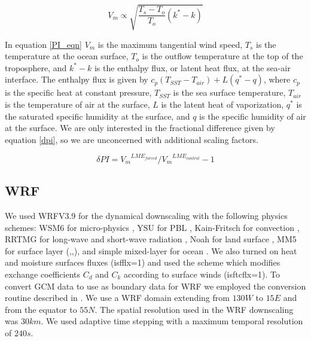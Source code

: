 \begin{equation}
{V_m} \propto \sqrt{\frac{T_s-T_{o}}{T_{o}}(k^{*}-k)}
\label{PI_eqn}
\end{equation}

In equation \ref{PI_eqn} $V_m$ is the maximum tangential wind speed, $T_s$ is the temperature at the ocean surface, $T_o$ is the outflow temperature at the top of the troposphere, and $k^{*}-k$ is the enthalpy flux, or latent heat flux, at the sea-air interface. The enthalpy flux is given by $c_p(T_{SST}-T_{air})+L(q^{*}-q)$, where $c_p$ is the specific heat at constant pressure, $T_{SST}$ is the sea surface temperature, $T_{air}$ is the temperature of air at the surface, $L$ is the latent heat of vaporization, $q^{*}$ is the saturated specific humidity at the surface, and $q$ is the specific humidity of air at the surface. We are only interested in the fractional difference given by equation \ref{dpi}, so we are unconcerned with additional scaling factors.

\begin{equation}
\delta PI = {V_{m}}^{LME_{forced}}/{V_{m}}^{LME_{control}}-1
\label{dpi}
\end{equation}


\subsection{WRF}
\label{WRF}
We used WRFV3.9 for the dynamical downscaling with the following physics schemes: WSM6 for micro-physics \cite{mp_phys}, YSU for PBL \cite{pbl_phys}, Kain-Fritsch for convection \cite{cu_phys}, RRTMG for long-wave and short-wave radiation \cite{rad_phys}, Noah for land surface \cite{sfc_phys}, MM5 for surface layer (\cite{sfclay_phys:1},\cite{sfclay_phys:2},\cite{sfclay_phys:3}), and simple mixed-layer for ocean \cite{ocn_phys}. We also turned on heat and moisture surfaces fluxes (isfflx=1) and used the scheme which modifies exchange coefficients $C_d$ and $C_k$ according to surface winds (isftcflx=1). To convert GCM data to use as boundary data for WRF we employed the conversion routine described in \cite{tech_notes}. We use a WRF domain extending from $130W$ to $15E$ and from the equator to $55N$. The spatial resolution used in the WRF downscaling was $30km$. We used adaptive time stepping with a maximum temporal resolution of $240s$.

